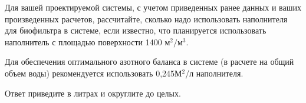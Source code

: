 
Для вашей проектируемой системы, с учетом приведенных ранее данных и ваших произведенных расчетов,  
рассчитайте, сколько надо использовать наполнителя для биофильтра в системе, если известно, что 
планируется использовать наполнитель с площадью поверхности 1400 $\text{м}^2/\text{м}^3$.

Для обеспечения оптимального азотного баланса в системе (в расчете на общий объем воды) 
рекомендуется использовать 0,245М$^2$/л наполнителя.

Ответ приведите в литрах и округлите до целых.